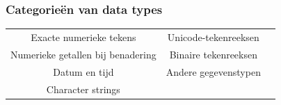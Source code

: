 \documentclass{report}
\begin{document}
    \subsubsection{Categorieën van data types}
    \begin{center}
        \begin{tabular}{ |c|c|c| } 
            \hline
            Exacte numerieke tekens & Unicode-tekenreeksen\\ 
            Numerieke getallen bij benadering & Binaire tekenreeksen\\ 
            Datum en tijd & Andere gegevenstypen\\ 
            Character strings & \\
            \hline
        \end{tabular}
    \end{center}
\end{document}
